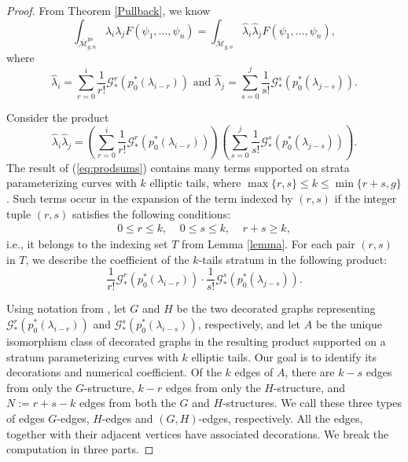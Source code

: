 \documentclass[leqno,12pt]{amsart}
\theoremstyle{remark}
\numberwithin{equation}{section}
\DeclareMathOperator{\ps}{ps}
\begin{document}
\begin{proof}
From Theorem \ref{Pullback}, we know $$\int_{\overline{\mathcal{M}}^{\ps}_{g, n}} \lambda_{i}\lambda_{j}F(\psi_1, \dots, \psi_n) = \int_{\overline{\mathcal{M}}_{g, n}} \hat{\lambda}_{i}\hat{\lambda}_{j}F(\psi_1, \dots, \psi_n),$$ where 
$$
\hat{\lambda}_{i} = \sum_{r=0}^{i}\frac{1}{r!}\mathcal{G}_*^r(p_0^*(\lambda_{i-r})) \text{ and } \hat{\lambda}_{j} = \sum_{s=0}^{j}\frac{1}{s!}\mathcal{G}_*^s(p_0^*(\lambda_{j-s})).
$$ 

Consider the product
\begin{equation}\label{eq:prodsums}
\hat{\lambda}_{i}\hat{\lambda}_{j} = \left(\sum_{r=0}^{i}\frac{1}{r!}\mathcal{G}_*^r(p_0^*(\lambda_{i-r}))\right)\left(\sum_{s=0}^{j}\frac{1}{s!}\mathcal{G}_*^s(p_0^*(\lambda_{j-s}))\right).
\end{equation}
The result of (\ref{eq:prodsums})  contains many terms supported on strata parameterizing curves with $k$ elliptic tails, where $\max\{r, s\} \leq k \leq \min\{r + s, g\}$. Such terms  occur in the expansion of the term indexed by $(r,s)$ if the integer tuple $(r, s)$ satisfies the following conditions: 
\begin{align}
\label{eq:range}
0 \leq r \leq k, \ \ \ \ \
0 \leq s \leq k, \ \ \ \ \
r +s \geq k,\end{align}
i.e., it belongs to the indexing set $T$ from Lemma \ref{lemma}.
For each pair $(r, s)$ in $T$, we describe the coefficient of the $k$-tails stratum in the following product:
\begin{equation}\label{eq:rs}
    \frac{1}{r!}\mathcal{G}_*^r(p_0^*(\lambda_{i-r}))\cdot\frac{1}{s!}\mathcal{G}_*^s(p_0^*(\lambda_{j-s})).
\end{equation}

Using notation from \cite{Yang}, let $G$ and $H$ be the two decorated graphs representing $\mathcal{G}_*^r(p_0^*(\lambda_{i-r}))$ and $\mathcal{G}_*^s(p_0^*(\lambda_{i-s}))$, respectively, and let $A$ be the unique isomorphism class of decorated graphs in the resulting product supported on a stratum parameterizing curves with $k$ elliptic tails. Our goal is to identify its decorations and numerical coefficient. Of the $k$ edges of $A$, there are $k-s$ edges from only the $G$-structure, $k-r$ edges from only the $H$-structure, and $N := r+s-k$ edges from both the $G$ and $H$-structures. We call these three types of edges $G$-edges, $H$-edges and $(G,H)$-edges, respectively. All the edges, together with their adjacent vertices  have associated decorations. We break the computation in three parts.


\end{proof}
\end{document}
